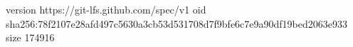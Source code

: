 version https://git-lfs.github.com/spec/v1
oid sha256:78f2107e28afd497c5630a3cb53d531708d7f9bfe6c7e9a90df19bed2063e933
size 174916
